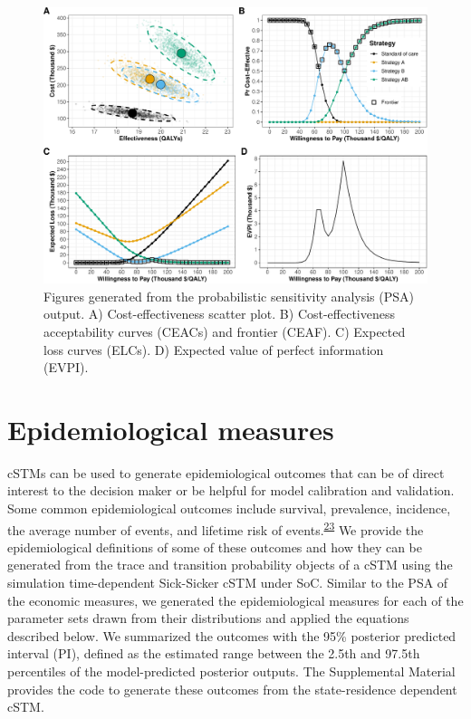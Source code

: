 \documentclass[
]{article}
\begin{document}
\begin{figure}[H]

{\centering \includegraphics{figs/PSA-figures-1} 

}

\caption{Figures generated from the probabilistic sensitivity analysis (PSA) output. A) Cost-effectiveness scatter plot. B) Cost-effectiveness acceptability curves (CEACs) and frontier (CEAF). C) Expected loss curves (ELCs). D) Expected value of perfect information (EVPI).}\label{fig:PSA-figures}
\end{figure}

\hypertarget{epidemiological-measures}{%
\section{Epidemiological measures}\label{epidemiological-measures}}

cSTMs can be used to generate epidemiological outcomes that can be of direct interest to the decision maker or be helpful for model calibration and validation. Some common epidemiological outcomes include survival, prevalence, incidence, the average number of events, and lifetime risk of events.\textsuperscript{\protect\hyperlink{ref-Siebert2012c}{23}} We provide the epidemiological definitions of some of these outcomes and how they can be generated from the trace and transition probability objects of a cSTM using the simulation time-dependent Sick-Sicker cSTM under SoC. Similar to the PSA of the economic measures, we generated the epidemiological measures for each of the parameter sets drawn from their distributions and applied the equations described below. We summarized the outcomes with the 95\% posterior predicted interval (PI), defined as the estimated range between the 2.5th and 97.5th percentiles of the model-predicted posterior outputs. The Supplemental Material provides the code to generate these outcomes from the state-residence dependent cSTM.
\end{document}
